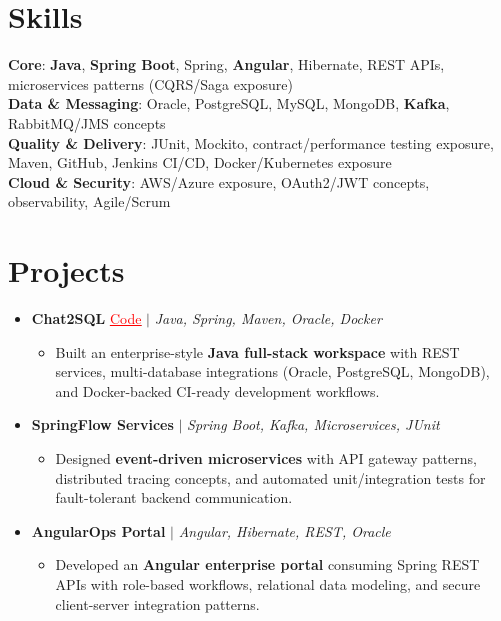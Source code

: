 \documentclass[letterpaper,10pt]{article}
\newcommand{\resumeItem}[1]{\item\small{{#1 \vspace{-2pt}}}}
\newcommand{\resumeProjectHeading}[1]{\item \small #1 \vspace{-2pt}}
\newcommand{\resumeSubHeadingListStart}{\begin{itemize}[leftmargin=0.0in, label={}]}
\newcommand{\resumeSubHeadingListEnd}{\end{itemize}}
\newcommand{\resumeProjItemListStart}{\begin{itemize}[leftmargin=0.15in,label=\textbullet,itemsep=0pt,topsep=0pt,parsep=0pt,partopsep=0pt]}
\newcommand{\resumeProjItemListEnd}{\end{itemize}\vspace{-4pt}}
\begin{document}
\section{Skills}
\begin{itemize}[leftmargin=0.15in, label={}]
\small{\item{
\textbf{Core}: \textbf{Java}, \textbf{Spring Boot}, Spring, \textbf{Angular}, Hibernate, REST APIs, microservices patterns (CQRS/Saga exposure) \\
\textbf{Data \& Messaging}: Oracle, PostgreSQL, MySQL, MongoDB, \textbf{Kafka}, RabbitMQ/JMS concepts \\
\textbf{Quality \& Delivery}: JUnit, Mockito, contract/performance testing exposure, Maven, GitHub, Jenkins CI/CD, Docker/Kubernetes exposure \\
\textbf{Cloud \& Security}: AWS/Azure exposure, OAuth2/JWT concepts, observability, Agile/Scrum
}}
\end{itemize}
\vspace{-16pt}
\section{Projects}
\resumeSubHeadingListStart
\vspace{-2pt}
\resumeProjectHeading{\textbf{Chat2SQL} {\href{https://github.com/SAHAJ-BHADJA/Chat2SQL}{\textcolor{red}{\underline{Code}}}} $|$ \emph{Java, Spring, Maven, Oracle, Docker}}
\resumeProjItemListStart
\resumeItem{Built an enterprise-style \textbf{Java full-stack workspace} with REST services, multi-database integrations (Oracle, PostgreSQL, MongoDB), and Docker-backed CI-ready development workflows.}
\resumeProjItemListEnd
\vspace{3pt}
\resumeProjectHeading{\textbf{SpringFlow Services} $|$ \emph{Spring Boot, Kafka, Microservices, JUnit}}
\resumeProjItemListStart
\resumeItem{Designed \textbf{event-driven microservices} with API gateway patterns, distributed tracing concepts, and automated unit/integration tests for fault-tolerant backend communication.}
\resumeProjItemListEnd
\vspace{3pt}
\resumeProjectHeading{\textbf{AngularOps Portal} $|$ \emph{Angular, Hibernate, REST, Oracle}}
\resumeProjItemListStart
\resumeItem{Developed an \textbf{Angular enterprise portal} consuming Spring REST APIs with role-based workflows, relational data modeling, and secure client-server integration patterns.}
\resumeProjItemListEnd
\resumeSubHeadingListEnd
\end{document}
